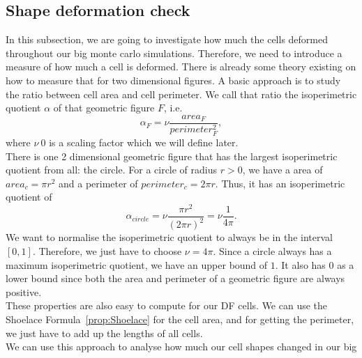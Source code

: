 

\subsection{Shape deformation check}
In this subsection, we are going to investigate how much the cells deformed throughout our big monte carlo simulations.
Therefore, we need to introduce a measure of how much a cell is deformed. 
There is already some theory existing on how to measure that for two dimensional figures. 
A basic approach is to study the ratio between cell area and cell perimeter. 
We call that ratio the isoperimetric quotient $\alpha$ of that geometric figure $F$, i.e. 
\[
    \alpha_{F} = \nu \dfrac{area_{F}}{perimeter_{F}^2},  
\]
where $\nu \> 0 $ is a scaling factor which we will define later. \\
There is one 2 dimensional geometric figure that has the largest isoperimetric quotient from all: the circle. 
For a circle of radius $r>0$, we have a area of $area_c = \pi r^2 $ and a perimeter of $perimeter_c = 2 \pi r $. 
Thus, it has an isoperimetric quotient of 
\[
    \alpha_{circle} = \nu \dfrac{\pi r^2}{(2 \pi r)^2} = \nu \dfrac{1}{4 \pi}.
\]
We want to normalise the isoperimetric quotient to always be in the interval $[0,1]$. 
Therefore, we just have to choose $\nu = 4 \pi$.
Since a circle always has a maximum isoperimetric quotient, we have an upper bound of $1$.
It also has $0$ as a lower bound since both the area and perimeter of a geometric figure are always positive. \\ 
These properties are also easy to compute for our DF cells. 
We can use the Shoelace Formula~\ref{prop:Shoelace} for the cell area, and for getting the perimeter, we just have to add up the lengths of all cells. \\ 

We can use this approach to analyse how much our cell shapes changed in our big 

